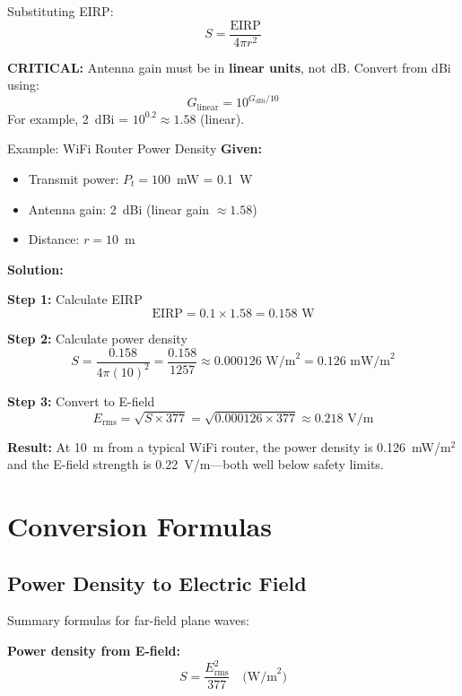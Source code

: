 Substituting EIRP:
\begin{equation}
S = \frac{\text{EIRP}}{4\pi r^2}
\label{eq:power-density-eirp}
\end{equation}

\begin{warningbox}
\textbf{CRITICAL:} Antenna gain must be in \textbf{linear units}, not dB. Convert from dBi using:
\[
G_{\text{linear}} = 10^{G_{\text{dBi}}/10}
\]
For example, 2~dBi = $10^{0.2} \approx 1.58$ (linear).
\end{warningbox}

\begin{calloutbox}{Example: WiFi Router Power Density}
\textbf{Given:}
\begin{itemize}
\item Transmit power: $P_t = 100$~mW = 0.1~W
\item Antenna gain: 2~dBi (linear gain $\approx 1.58$)
\item Distance: $r = 10$~m
\end{itemize}

\textbf{Solution:}

\textbf{Step 1:} Calculate EIRP
\[
\text{EIRP} = 0.1 \times 1.58 = 0.158 \text{~W}
\]

\textbf{Step 2:} Calculate power density
\[
S = \frac{0.158}{4\pi (10)^2} = \frac{0.158}{1257} \approx 0.000126 \text{~W/m}^2 = 0.126 \text{~mW/m}^2
\]

\textbf{Step 3:} Convert to E-field
\[
E_{\text{rms}} = \sqrt{S \times 377} = \sqrt{0.000126 \times 377} \approx 0.218 \text{~V/m}
\]

\textbf{Result:} At 10~m from a typical WiFi router, the power density is 0.126~mW/m$^2$ and the E-field strength is 0.22~V/m---both well below safety limits.
\end{calloutbox}

\section{Conversion Formulas}

\subsection{Power Density to Electric Field}

Summary formulas for far-field plane waves:

\textbf{Power density from E-field:}
\begin{equation}
S = \frac{E_{\text{rms}}^2}{377} \quad \text{(W/m}^2\text{)}
\label{eq:s-from-e-conversion}
\end{equation}

